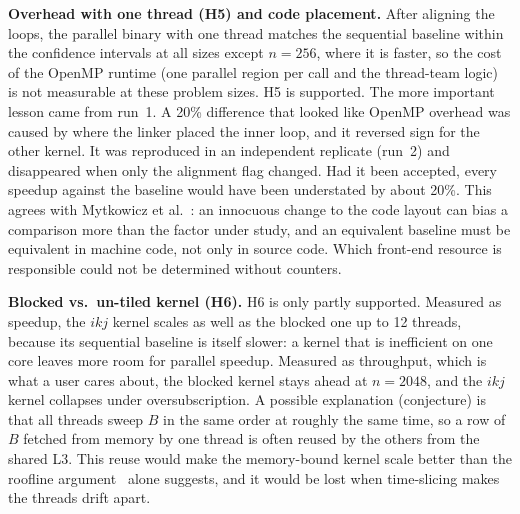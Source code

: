 \documentclass[conference,a4paper]{IEEEtran}
\begin{document}
\textbf{Overhead with one thread (H5) and code placement.} After aligning the loops, the parallel binary with one
thread matches the sequential baseline within the confidence intervals at all sizes except $n=256$, where it is
faster, so the cost of the OpenMP runtime (one parallel region per call and the thread-team logic) is not measurable at
these problem sizes. H5 is supported. The more important lesson came from run~1. A 20\% difference that looked like
OpenMP overhead was caused by where the linker placed the inner loop, and it reversed sign for the other kernel. It was
reproduced in an independent replicate (run~2) and disappeared when only the alignment flag changed. Had it been
accepted, every speedup against the baseline would have been understated by about 20\%. This agrees with Mytkowicz et al.~\cite{mytkowicz2009}: an innocuous
change to the code layout can bias a comparison more than the factor under study, and an equivalent baseline must be
equivalent in machine code, not only in source code. Which front-end resource is responsible could not be determined
without counters.

\textbf{Blocked vs.\ un-tiled kernel (H6).} H6 is only partly supported. Measured as speedup, the $ikj$ kernel scales as
well as the blocked one up to 12 threads, because its sequential baseline is itself slower: a kernel that is
inefficient on one core leaves more room for parallel speedup. Measured as throughput, which is what a user cares about,
the blocked kernel stays ahead at $n=2048$, and the $ikj$ kernel collapses under oversubscription. A possible
explanation (conjecture) is that all threads sweep $B$ in the same order at roughly the same time, so a row of $B$ fetched
from memory by one thread is often reused by the others from the shared L3. This reuse would make the memory-bound kernel
scale better than the roofline argument~\cite{williams2009} alone suggests, and it would be lost when time-slicing makes the
threads drift apart.
\end{document}
